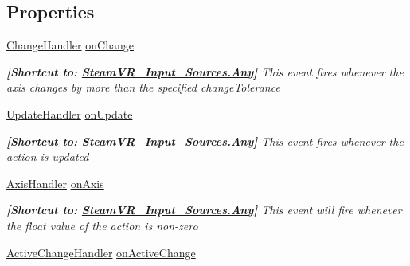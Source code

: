 \subsection*{Properties}
\begin{DoxyCompactItemize}
\item 
\mbox{\hyperlink{class_valve_1_1_v_r_1_1_steam_v_r___action___single_ae0c72c83dccd88a0235e8a831d62116e}{Change\+Handler}} \mbox{\hyperlink{class_valve_1_1_v_r_1_1_steam_v_r___action___single_a86a5b4eead30dce2d9f13859571778d3}{on\+Change}}
\begin{DoxyCompactList}\small\item\em {\bfseries{\mbox{[}Shortcut to\+: \mbox{\hyperlink{namespace_valve_1_1_v_r_a82e5bf501cc3aa155444ee3f0662853faed36a1ef76a59ee3f15180e0441188ad}{Steam\+V\+R\+\_\+\+Input\+\_\+\+Sources.\+Any}}\mbox{]}}} This event fires whenever the axis changes by more than the specified change\+Tolerance \end{DoxyCompactList}\item 
\mbox{\hyperlink{class_valve_1_1_v_r_1_1_steam_v_r___action___single_a1514666eabcafba498274e8d6cee2a40}{Update\+Handler}} \mbox{\hyperlink{class_valve_1_1_v_r_1_1_steam_v_r___action___single_a560a7271eccd9441f110d40beed27170}{on\+Update}}
\begin{DoxyCompactList}\small\item\em {\bfseries{\mbox{[}Shortcut to\+: \mbox{\hyperlink{namespace_valve_1_1_v_r_a82e5bf501cc3aa155444ee3f0662853faed36a1ef76a59ee3f15180e0441188ad}{Steam\+V\+R\+\_\+\+Input\+\_\+\+Sources.\+Any}}\mbox{]}}} This event fires whenever the action is updated \end{DoxyCompactList}\item 
\mbox{\hyperlink{class_valve_1_1_v_r_1_1_steam_v_r___action___single_a4193937cd6b6e4b7248374bc5636f6fd}{Axis\+Handler}} \mbox{\hyperlink{class_valve_1_1_v_r_1_1_steam_v_r___action___single_a54b775fb731fcfddfb12298d3c6cd42c}{on\+Axis}}
\begin{DoxyCompactList}\small\item\em {\bfseries{\mbox{[}Shortcut to\+: \mbox{\hyperlink{namespace_valve_1_1_v_r_a82e5bf501cc3aa155444ee3f0662853faed36a1ef76a59ee3f15180e0441188ad}{Steam\+V\+R\+\_\+\+Input\+\_\+\+Sources.\+Any}}\mbox{]}}} This event will fire whenever the float value of the action is non-\/zero \end{DoxyCompactList}\item 
\mbox{\hyperlink{class_valve_1_1_v_r_1_1_steam_v_r___action___single_a45ad70dbb8a58191f373b7ae098b833b}{Active\+Change\+Handler}} \mbox{\hyperlink{class_valve_1_1_v_r_1_1_steam_v_r___action___single_a3067f41e74c07aa2b18fa374290fe78d}{on\+Active\+Change}}

\end{DoxyCompactItemize}
